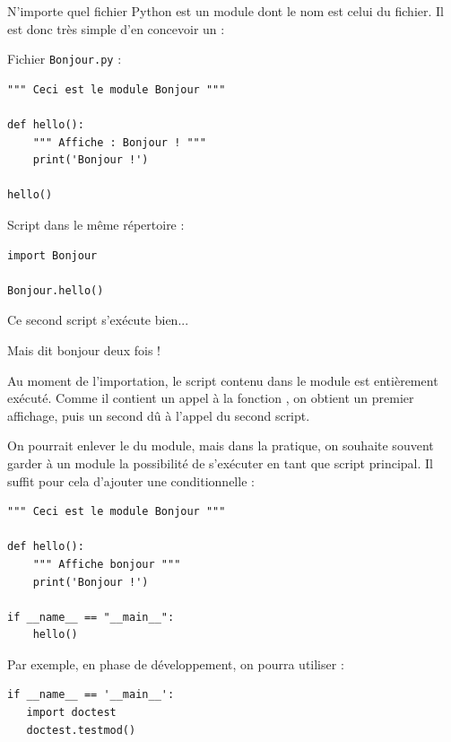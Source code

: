 N'importe quel fichier Python est un module dont le nom est celui du fichier. Il est donc très simple d'en concevoir un :

\begin{multicols}{2}
Fichier \texttt{Bonjour.py} :

\vspace{-2ex}
\begin{verbatim}
""" Ceci est le module Bonjour """

def hello():
    """ Affiche : Bonjour ! """
    print('Bonjour !')

hello()
\end{verbatim}

Script dans le même répertoire :

\begin{verbatim}
import Bonjour

Bonjour.hello()
\end{verbatim}

Ce second script s'exécute bien...

Mais dit bonjour deux fois !
\end{multicols}

Au moment de l'importation, le script contenu dans le module est entièrement exécuté. Comme il contient un appel à la fonction , on obtient un premier affichage, puis un second dû à l'appel  du second script.

On pourrait enlever le  du module, mais dans la pratique, on souhaite souvent garder à un module la possibilité de s'exécuter en tant que script principal. Il suffit pour cela d'ajouter une conditionnelle :

\begin{multicols}{2}
\begin{verbatim}
""" Ceci est le module Bonjour """

def hello():
    """ Affiche bonjour """
    print('Bonjour !')
    
if __name__ == "__main__":
    hello()
\end{verbatim}

Par exemple, en phase de développement, on pourra utiliser :

\begin{verbatim}
if __name__ == '__main__':
   import doctest
   doctest.testmod()
\end{verbatim}
\end{multicols}

